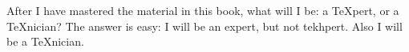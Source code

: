 After I have mastered the material in this book, what will I be:
a \TeX pert, or a \TeX nician?
The answer is easy: I will be an expert, but not tekhpert.
Also I will be a \TeX nician.
\bye
